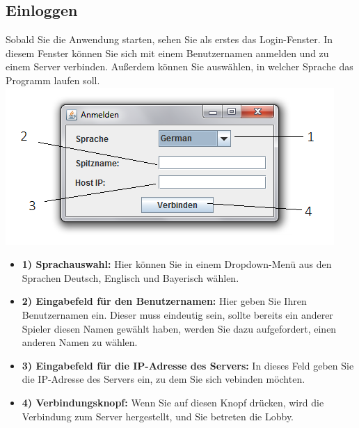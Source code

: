 \documentclass[titlepage,10pt,a4paper]{article}
\begin{document}
\subsection{Einloggen}
Sobald Sie die Anwendung starten, sehen Sie als erstes das Login-Fenster. In diesem Fenster können Sie sich mit einem Benutzernamen anmelden und zu einem \gls{Server} verbinden. Außerdem können Sie auswählen, in welcher Sprache das Programm laufen soll.\\
\includegraphics[width=\textwidth]{Login-Fenster}
\begin{itemize}
	\item \textbf{1) Sprachauswahl:} Hier können Sie in einem Dropdown-Menü aus den Sprachen Deutsch, Englisch und Bayerisch wählen.
	\item \textbf{2) Eingabefeld für den Benutzernamen:} Hier geben Sie Ihren Benutzernamen ein. Dieser muss eindeutig sein, sollte bereits ein anderer Spieler diesen Namen gewählt haben, werden Sie dazu aufgefordert, einen anderen Namen zu wählen.
	\item \textbf{3) Eingabefeld für die \gls{IP-Adresse} des \gls{Server}s:} In dieses Feld geben Sie die \gls{IP-Adresse} des \gls{Server}s ein, zu dem Sie sich vebinden möchten.
	\item \textbf{4) Verbindungsknopf:} Wenn Sie auf diesen Knopf drücken, wird die Verbindung zum \gls{Server} hergestellt, und Sie betreten die \gls{Lobby}.
\end{itemize}
\end{document}
